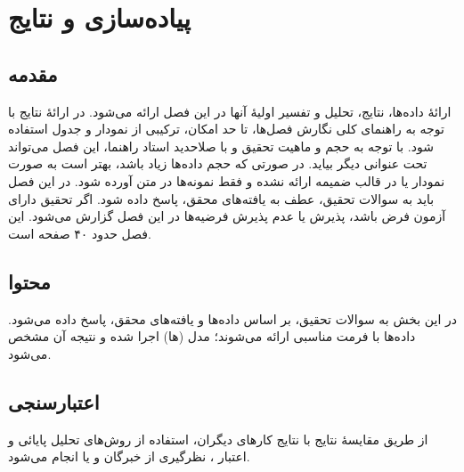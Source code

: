 \chapter{پیاده‌سازی و نتایج}
\label{chap:results}
\section{مقدمه} 
ارائهٔ داده‌ها، نتایج، تحلیل و تفسیر اولیهٔ آنها در این فصل ارائه می‌شود. در ارائهٔ نتایج با توجه به راهنمای کلی نگارش فصل‌ها، تا حد امکان، ترکیبی از نمودار و جدول استفاده شود. با توجه به حجم و ماهیت تحقیق و با صلاحدید استاد راهنما، این فصل می‌تواند تحت عنوانی دیگر بیاید. در صورتی که حجم داده‌ها زیاد باشد، بهتر است به صورت نمودار یا در قالب ضمیمه ارائه نشده و فقط نمونه‌ها در متن آورده شود. در این فصل باید به سوالات تحقیق، عطف به یافته‌های محقق، پاسخ داده شود. اگر تحقیق دارای آزمون فرض باشد، پذیرش یا عدم پذیرش فرضیه‌ها در این فصل گزارش می‌شود. این فصل حدود ۴۰ صفحه است.

\section{محتوا}
در این بخش به سوالات تحقیق، بر اساس داده‌ها و یافته‌های محقق، پاسخ داده می‌شود. داده‌ها با فرمت مناسبی ارائه می‌شوند؛ مدل (ها) اجرا شده و نتیجه آن مشخص می‌شود.

\section{اعتبارسنجی}
از طریق مقایسهٔ نتایج با نتایج کارهای دیگران، استفاده از روش‌های تحلیل پایائی
و اعتبار
،
نظرگیری از خبرگان
و یا
انجام می‌شود.
